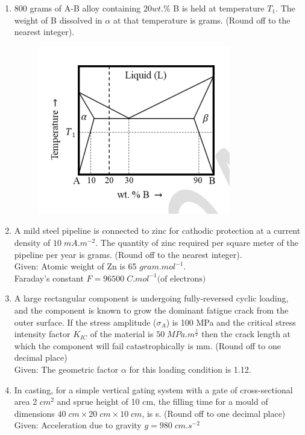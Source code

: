 \documentclass[journal]{IEEEtran}
\theoremstyle{remark}
\begin{document}
\begin{enumerate}[resume]
\item 800 grams of A-B alloy containing $20 wt.\%$ B is held at temperature $T_1$. The weight of B dissolved in $\alpha$ at that temperature is \underline{\hspace{2cm}} grams. (Round off to the nearest integer). \hfill{}
\begin{figure}[H]
    \centering
    \includegraphics[width=0.5\columnwidth]{figs/Q.61.png}
    \caption{}
    \label{fig:placeholder}
\end{figure}

\item A mild steel pipeline is connected to zinc for cathodic protection at a current density of $10\; mA.m^{-2}$. The quantity of zinc required per square meter of the pipeline per year is \underline{\hspace{2cm}} grams. (Round off to the nearest integer). \hfill{}\\
Given: Atomic weight of Zn is 65 $gram.mol^{-1}$. \\
Faraday's constant $F = 96500\; C.mol^{-1}\text{(of electrons)}$

\item A large rectangular component is undergoing fully-reversed cyclic loading, and the component is known to grow the dominant fatigue crack from the outer surface. If the stress amplitude ($\sigma_A$) is 100 MPa and the critical stress intensity factor $K_{IC}$ of the material is $50\; MPa.m^{\frac{1}{2}}$ then the crack length at which the component will fail catastrophically is \underline{\hspace{2cm}} mm. (Round off to one decimal place) \hfill{}\\
Given: The geometric factor $\alpha$ for this loading condition is 1.12.

\item In casting, for a simple vertical gating system with a gate of cross-sectional area 2 $cm^2$ and sprue height of 10 cm, the filling time for a mould of dimensions $40\; cm \times 20\; cm \times 10\; cm$, is \underline{\hspace{2cm}} s. (Round off to one decimal place) \hfill{}\\
Given: Acceleration due to gravity $g = 980\; cm.s^{-2}$


\end{enumerate}
\end{document}
